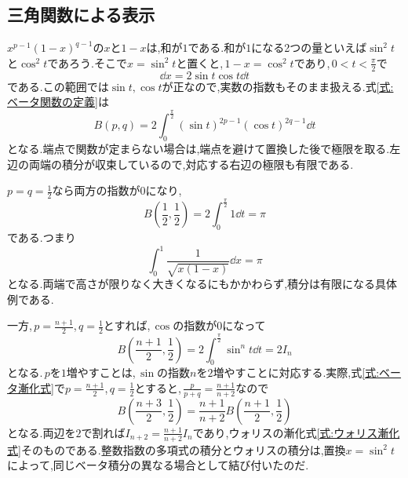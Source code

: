\subsection{三角関数による表示}

$x^{p-1}(1-x)^{q-1}$の$x$と$1-x$は,和が$1$である.和が$1$になる2つの量といえば$\sin^2t$と$\cos^2t$であろう.そこで$x=\sin^2t$と置くと,\,$1-x=\cos^2t$であり,\,$0<t<\frac{\pi}{2}$で
\[
 \dd x=2\sin t\cos t\dd t
\]
である.この範囲では$\sin t,\cos t$が正なので,実数の指数もそのまま扱える.式\eqref{式:ベータ関数の定義}は
\begin{equation}\label{式:ベータ三角表示}
 B(p,q)=2\int_0^{\frac{\pi}{2}}
 (\sin t)^{2p-1}(\cos t)^{2q-1}\dd t
\end{equation}
となる.端点で関数が定まらない場合は,端点を避けて置換した後で極限を取る.左辺の両端の積分が収束しているので,対応する右辺の極限も有限である.

$p=q=\frac12$なら両方の指数が$0$になり,
\[
 B\left(\frac12,\frac12\right)
 =2\int_0^{\frac{\pi}{2}}1\dd t=\pi
\]
である.つまり
\[
 \int_0^1\frac1{\sqrt{x(1-x)}}\dd x=\pi
\]
となる.両端で高さが限りなく大きくなるにもかかわらず,積分は有限になる具体例である.

一方,\,$p=\frac{n+1}{2}$,\,$q=\frac12$とすれば,\,$\cos$の指数が$0$になって
\[
 B\left(\frac{n+1}{2},\frac12\right)=2\int_0^{\frac\pi2}\sin^nt\dd t=2I_n
\]
となる.\,$p$を$1$増やすことは,\,$\sin$の指数$n$を$2$増やすことに対応する.実際,式\eqref{式:ベータ漸化式}で$p=\frac{n+1}2$,\,$q=\frac12$とすると,\,$\frac{p}{p+q}=\frac{n+1}{n+2}$なので
\[
 B\left(\frac{n+3}{2},\frac12\right)
 =\frac{n+1}{n+2}
  B\left(\frac{n+1}{2},\frac12\right)
\]
となる.両辺を$2$で割れば$I_{n+2}=\frac{n+1}{n+2}I_n$であり,ウォリスの漸化式\eqref{式:ウォリス漸化式}そのものである.整数指数の多項式の積分とウォリスの積分は,置換$x=\sin^2t$によって,同じベータ積分の異なる場合として結び付いたのだ.
